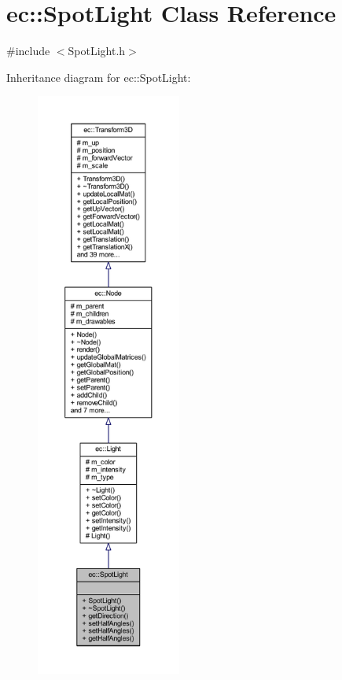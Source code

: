 \hypertarget{classec_1_1_spot_light}{}\section{ec\+:\+:Spot\+Light Class Reference}
\label{classec_1_1_spot_light}


{\ttfamily \#include $<$Spot\+Light.\+h$>$}



Inheritance diagram for ec\+:\+:Spot\+Light\+:\nopagebreak
\begin{figure}[H]
\begin{center}
\leavevmode
\includegraphics[height=550pt]{classec_1_1_spot_light__inherit__graph}
\end{center}
\end{figure}


